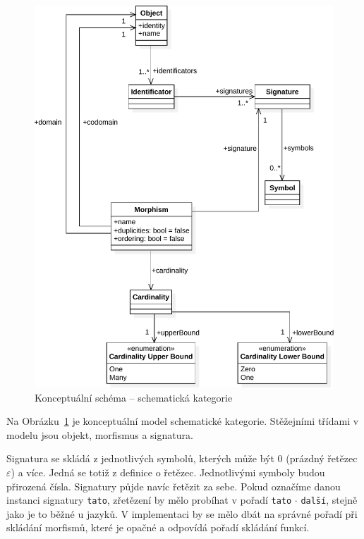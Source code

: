 \begin{figure}[!htb]
  \centering
  \includegraphics[width=\maxwidth{\textwidth}]{../img/diagrams/schema-category-model.pdf}
  \caption{Konceptuální schéma -- schematická kategorie}
  \label{fig:class-diagram:schemcat}
\end{figure}

Na Obrázku~\ref{fig:class-diagram:schemcat} je konceptuální model schematické kategorie.
Stěžejními třídami v modelu jsou objekt, morfismus a signatura.

Signatura se skládá z jednotlivých symbolů, kterých může být 0 (prázdný řetězec $\varepsilon$) a více.
Jedná se totiž z definice o řetězec.
Jednotlivými symboly budou přirozená čísla.
Signatury půjde navíc řetězit za sebe.
Pokud označíme danou instanci signatury \texttt{tato}, zřetězení by mělo probíhat v pořadí \texttt{tato} $\cdot$ \texttt{další}, stejně jako je to běžné u jazyků.
V implementaci by se mělo dbát na správné pořadí při skládání morfismů, které je opačné a odpovídá pořadí skládání funkcí.

